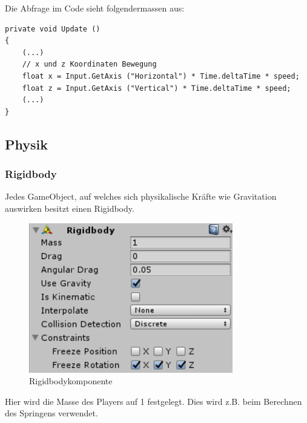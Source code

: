 Die Abfrage im Code sieht folgendermassen aus:

\begin{lstlisting}[caption={Abfrage der X- und Z-Achsen im Code}]
private void Update ()
{
	(...)
	// x und z Koordinaten Bewegung
	float x = Input.GetAxis ("Horizontal") * Time.deltaTime * speed;
	float z = Input.GetAxis ("Vertical") * Time.deltaTime * speed;
	(...)
}      
\end{lstlisting}

\subsection{Physik}

\subsubsection{Rigidbody}
Jedes GameObject, auf welches sich physikalische Kräfte wie Gravitation auswirken besitzt einen Rigidbody.
\begin{figure}[H]
\includegraphics[scale=0.8]{screenshots/rigidbody.png}
\caption{Rigidbodykomponente}
\end{figure}
Hier wird die Masse des Players auf 1 festgelegt. Dies wird z.B. beim Berechnen des Springens verwendet.

